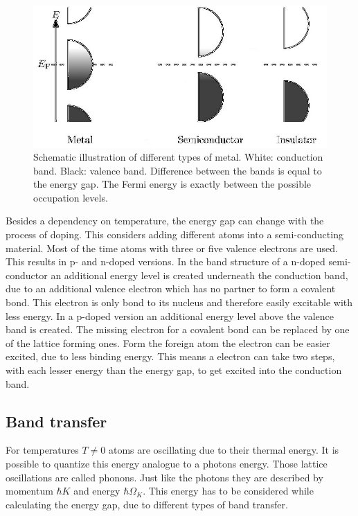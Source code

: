 \documentclass[]{article}
\begin{document}
\begin{figure}[H]
\centering
\includegraphics[width=.7\textwidth]{Plots/bandstructure.png}
\caption{Schematic illustration of different types of metal. White: conduction band. Black: valence band. Difference between the bands is equal to the energy gap. The Fermi energy is exactly between the possible occupation levels. \cite{wiki}}
\label{fig:bandstructure}
\end{figure}

Besides a dependency on temperature, the energy gap can change with the process of doping. This considers adding different atoms into a semi-conducting material. Most of the time atoms with three or five valence electrons are used. This results in p- and n-doped versions. In the band structure of a n-doped semi-conductor an additional energy level is created underneath the conduction band, due to an additional valence electron which has no partner to form a covalent bond. This electron is only bond to its nucleus and therefore easily excitable with less energy.
In a p-doped version an additional energy level above the valence band is created. The missing electron for a covalent bond can be replaced by one of the lattice forming ones. Form the foreign atom the electron can be easier excited, due to less binding energy. This means a electron can take two steps, with each lesser energy than the energy gap, to get excited into the conduction band.

\subsection{Band transfer}
For temperatures $T\neq 0$ atoms are oscillating due to their thermal energy. It is possible to quantize this energy analogue to a photons energy. Those lattice oscillations are called phonons. Just like the photons they are described by momentum $\hbar K$ and energy $\hbar \Omega_K$. This energy has to be considered while calculating the energy gap, due to different types of band transfer.
\end{document}
